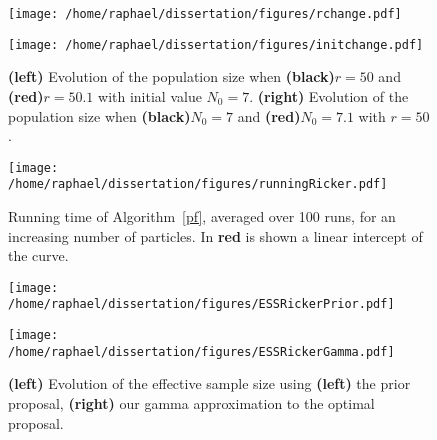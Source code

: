 \documentclass{article}
\begin{document}
	\begin{figure}[htb]
		\centering
		\begin{minipage}{0.4\textwidth}
			\centering
			\texttt{[image: /home/raphael/dissertation/figures/rchange.pdf]}
		\end{minipage}
		\begin{minipage}{0.4\textwidth}
			\centering
			\texttt{[image: /home/raphael/dissertation/figures/initchange.pdf]}
		\end{minipage}
		\caption{\textbf{(left)} Evolution of the population size when \textbf{(black)}$r=50$ and \textbf{(red)}$r=50.1$ with initial value $N_0=7$. \textbf{(right)} Evolution of the population size when \textbf{(black)}$N_0=7$ and \textbf{(red)}$N_0=7.1$ with $r=50$.}
		\label{fig:chaos}
	\end{figure}

	\begin{figure}[htb]
		\centering
		\begin{minipage}{0.4\textwidth}
			\centering
			\texttt{[image: /home/raphael/dissertation/figures/runningRicker.pdf]}
		\end{minipage}
		\caption{Running time of Algorithm~\ref{pf}, averaged over 100 runs, for an increasing number of particles. In \textbf{red} is shown a linear intercept of the curve.}
		\label{fig:runningRicker}
	\end{figure}

	\begin{figure}[htb]
		\centering
		\begin{minipage}{0.4\textwidth}
			\centering
			\texttt{[image: /home/raphael/dissertation/figures/ESSRickerPrior.pdf]}
		\end{minipage}
		\begin{minipage}{0.4\textwidth}
			\centering
			\texttt{[image: /home/raphael/dissertation/figures/ESSRickerGamma.pdf]}
		\end{minipage}
		\caption{\textbf{(left)} Evolution of the effective sample size using \textbf{(left)} the prior proposal, \textbf{(right)} our gamma approximation to the optimal proposal.}
		\label{fig:essRicker}
	\end{figure}
	
\end{document}
